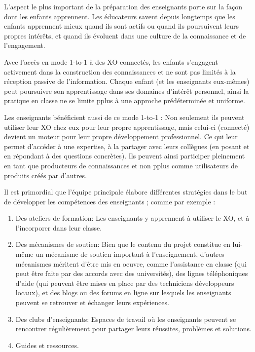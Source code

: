 \documentclass[12pt]{article}
\begin{document}
L'aspect le plus important de la préparation des enseignants porte sur la
façon  dont les enfants apprennent. Les éducateurs savent depuis longtemps
que les enfants apprennent mieux quand ils sont actifs ou quand ils
poursuivent leurs propres intérêts, et quand ils évoluent dans une culture
de la connaissance et de l'engagement. 

Avec l'accès en mode 1-to-1 à des XO connectés, les enfants s'engagent
activement dans la construction des connaissances et ne sont pas limités à
la réception passive de l'information. Chaque enfant (et les enseignants
eux-mêmes) peut poursuivre son apprentissage dans ses domaines d'intérêt
personnel, ainsi la pratique en classe ne se limite pplus à une approche
prédéterminée et uniforme. 

Les enseignants bénéficient aussi de ce mode 1-to-1 : Non seulement ils
peuvent utiliser leur XO chez eux pour leur propre apprentissage, mais
celui-ci (connecté) devient un moteur pour leur propre développement
professionnel. Ce qui leur permet d'accéder à une expertise, à la partager
avec leurs collègues (en posant et en répondant à des questions
concrètes). Ils peuvent ainsi participer pleinement en tant que producteurs
de connaissances et non pplus comme utilisateurs de produits créés par
d'autres. 

Il est primordial que l'équipe principale élabore différentes stratégies
dans le but de développer les compétences des enseignants ; comme par
exemple : 


\begin{enumerate}
\item Des ateliers de formation: Les enseignants y apprennent à utiliser le
   XO, et à l'incorporer dans leur classe.
\item Des mécanismes de soutien: Bien que le contenu du projet constitue en
   lui-même un mécanisme de soutien important à l'enseignement, d'autres
   mécanismes méritent d'être mis en oeuvre, comme l'assistance en classe
   (qui peut être faite par des accords avec des universités), des lignes
   téléphoniques d'aide (qui peuvent être mises en place par des
   techniciens développeurs locaux), et des blogs ou des forums en ligne
   sur lesquels les enseignants peuvent se retrouver et échanger leurs
   expériences.
\item Des clubs d'enseignants: Espaces de travail où les enseignants peuvent
   se rencontrer régulièrement pour partager leurs réussites, problèmes et
   solutions.
\item Guides et ressources.
\end{enumerate}
\end{document}
